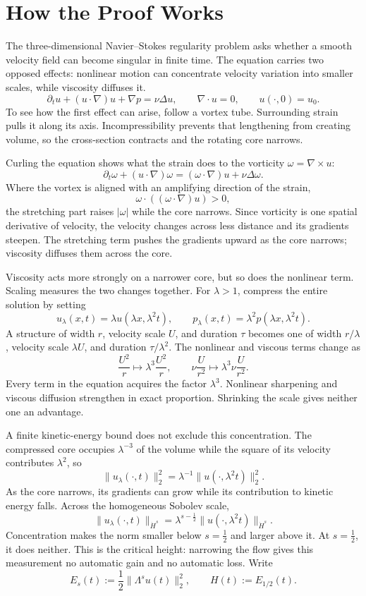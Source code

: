 \documentclass[11pt]{article}
\begin{document}
\section*{How the Proof Works}

The three-dimensional Navier--Stokes regularity problem asks whether a smooth velocity field can become singular in finite time. The equation carries two opposed effects: nonlinear motion can concentrate velocity variation into smaller scales, while viscosity diffuses it.
\[
\partial_tu+(u\cdot\nabla)u+\nabla p=\nu\Delta u,
\qquad \nabla\cdot u=0,
\qquad u(\cdot,0)=u_0.
\]
To see how the first effect can arise, follow a vortex tube. Surrounding strain pulls it along its axis. Incompressibility prevents that lengthening from creating volume, so the cross-section contracts and the rotating core narrows.

Curling the equation shows what the strain does to the vorticity \(\omega=\nabla\times u\):
\[
\partial_t\omega+(u\cdot\nabla)\omega
=(\omega\cdot\nabla)u+\nu\Delta\omega.
\]
Where the vortex is aligned with an amplifying direction of the strain,
\[
\omega\cdot((\omega\cdot\nabla)u)>0,
\]
the stretching part raises \(\lvert\omega\rvert\) while the core narrows. Since vorticity is one spatial derivative of velocity, the velocity changes across less distance and its gradients steepen. The stretching term pushes the gradients upward as the core narrows; viscosity diffuses them across the core.

Viscosity acts more strongly on a narrower core, but so does the nonlinear term. Scaling measures the two changes together. For \(\lambda>1\), compress the entire solution by setting
\[
u_\lambda(x,t)=\lambda u(\lambda x,\lambda^2t),
\qquad
p_\lambda(x,t)=\lambda^2p(\lambda x,\lambda^2t).
\]
A structure of width \(r\), velocity scale \(U\), and duration \(\tau\) becomes one of width \(r/\lambda\), velocity scale \(\lambda U\), and duration \(\tau/\lambda^2\). The nonlinear and viscous terms change as
\[
\frac{U^2}{r}
\longmapsto
\lambda^3\frac{U^2}{r},
\qquad
\nu\frac{U}{r^2}
\longmapsto
\lambda^3\nu\frac{U}{r^2}.
\]
Every term in the equation acquires the factor \(\lambda^3\). Nonlinear sharpening and viscous diffusion strengthen in exact proportion. Shrinking the scale gives neither one an advantage.

A finite kinetic-energy bound does not exclude this concentration. The compressed core occupies \(\lambda^{-3}\) of the volume while the square of its velocity contributes \(\lambda^2\), so
\[
\|u_\lambda(\cdot,t)\|_2^2
=\lambda^{-1}\|u(\cdot,\lambda^2t)\|_2^2.
\]
As the core narrows, its gradients can grow while its contribution to kinetic energy falls. Across the homogeneous Sobolev scale,
\[
\|u_\lambda(\cdot,t)\|_{\dot H^s}
=\lambda^{s-\frac12}
\|u(\cdot,\lambda^2t)\|_{\dot H^s}.
\]
Concentration makes the norm smaller below \(s=\tfrac12\) and larger above it. At \(s=\tfrac12\), it does neither. This is the critical height: narrowing the flow gives this measurement no automatic gain and no automatic loss. Write
\[
E_s(t):=\frac12\|\Lambda^su(t)\|_2^2,
\qquad
H(t):=E_{1/2}(t).
\]
\end{document}
